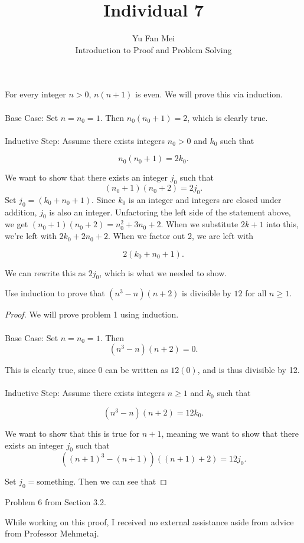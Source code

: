 \documentclass[12pt]{article}
\newenvironment{lemma}[2][Lemma]{\begin{trivlist}
\item[\hskip \labelsep {\bfseries #1}\hskip \labelsep {\bfseries #2.}]}{\end{trivlist}}
\newenvironment{problem}[2][Problem]{\begin{trivlist}
\item[\hskip \labelsep {\bfseries #1}\hskip \labelsep {\bfseries #2.}]}{\end{trivlist}}
\begin{document}

\title{Individual 7}%
\author{Yu Fan Mei\\ %
	Introduction to Proof and Problem Solving} %

\maketitle

\begin{lemma}{1} For every integer $n > 0$, $n(n+1)$ is even. We will prove this via induction. \noindent \\ \\
    Base Case: Set $n = n_0 = 1$. Then $n_0(n_0+1) = 2$, which is clearly true. \\ \\ \noindent
    Inductive Step: Assume there exists integers $n_0 > 0$ and $k_0$ such that

    $$n_0(n_0+1) = 2k_0.$$

    We want to show that there exists an integer $j_0$ such that
    $$(n_0+1)(n_0+2) = 2j_0.$$
    Set $j_0 = (k_0 + n_0 + 1)$. Since $k_0$ is an integer and integers are closed under addition, $j_0$ is also an integer. Unfactoring the left side of the statement above, we get $(n_0+1)(n_0+2) = n_0^2 + 3n_0 + 2$. When we substitute $2k+1$ into this, we're left with $2k_0 + 2n_0 + 2$. When we factor out 2, we are left with

    $$2(k_0 + n_0 + 1).$$

    We can rewrite this as $2j_0$, which is what we needed to show.
\end{lemma}

\begin{problem}{1}
    Use induction to prove that $(n^3 - n)(n + 2)$ is divisible by $12$ for all $n \geq 1$.
\end{problem}

\begin{proof} We will prove problem 1 using induction. \\ \\
    Base Case: Set $n = n_0 = 1$. Then
    $$(n^3 - n)(n + 2) = 0.$$

    This is clearly true, since 0 can be written as $12(0)$, and is thus divisible by 12. \\ \\

    Inductive Step: Assume there exists integers $n \geq 1$ and $k_0$ such that

    $$(n^3 - n)(n + 2) = 12k_0.$$

    We want to show that this is true for $n + 1$, meaning we want to show that there exists an integer $j_0$ such that
    $$((n+1)^3 - (n+1))((n+1) + 2) = 12j_0.$$

    Set $j_0 = \text{something}.$ Then we can see that


\end{proof}

\begin{problem}{2}
    Problem 6 from Section 3.2.
\end{problem}


\noindent While working on this proof, I received no external assistance aside from advice from Professor Mehmetaj.
\end{document}
